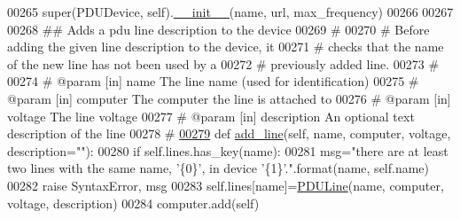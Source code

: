\begin{DoxyCode}
00265         super(PDUDevice, self).\hyperlink{classsettings__classes_1_1_p_d_u_device_ac775ee34451fdfa742b318538164070e}{__init__}(name, url, max\_frequency)
00266 
00267 
00268     \textcolor{comment}{## Adds a pdu line description to the device}
00269     \textcolor{comment}{#}
00270     \textcolor{comment}{#  Before adding the given line description to the device, it}
00271     \textcolor{comment}{#  checks that the name of the new line has not been used by a}
00272     \textcolor{comment}{#  previously added line.}
00273     \textcolor{comment}{#}
00274     \textcolor{comment}{# @param [in] name        The line name (used for identification)}
00275     \textcolor{comment}{# @param [in] computer    The computer the line is attached to}
00276     \textcolor{comment}{# @param [in] voltage     The line voltage}
00277     \textcolor{comment}{# @param [in] description An optional text description of the line}
00278     \textcolor{comment}{#}
\hypertarget{settings__classes_8py_source_l00279}{}\hyperlink{classsettings__classes_1_1_p_d_u_device_a9b24e7f6a176430603b1aec4ead55473}{00279}     \textcolor{keyword}{def }\hyperlink{classsettings__classes_1_1_p_d_u_device_a9b24e7f6a176430603b1aec4ead55473}{add_line}(self, name, computer, voltage, description=""):
00280         \textcolor{keywordflow}{if} self.lines.has\_key(name):
00281             msg=\textcolor{stringliteral}{"there are at least two lines with the same name, '\{0\}', in
       device '\{1\}'."}.format(name, self.name)
00282             \textcolor{keywordflow}{raise} SyntaxError, msg
00283         self.lines[name]=\hyperlink{classsettings__classes_1_1_p_d_u_line}{PDULine}(name, computer, voltage, description)
00284         computer.add(self)
\end{DoxyCode}
